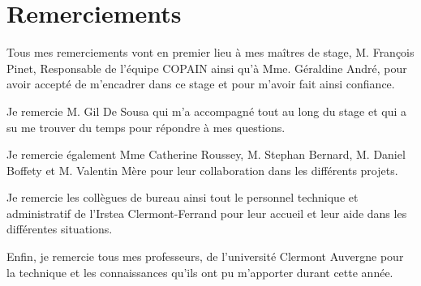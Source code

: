 \pagebreak
\thispagestyle{empty}
\hspace{0pt}
\vfill
\section{Remerciements}
\begin{em}
Tous mes remerciements vont en premier lieu à mes maîtres de stage, M. François Pinet, Responsable de l'équipe COPAIN ainsi qu'à Mme. Géraldine André, pour avoir accepté de m'encadrer dans ce stage et pour m'avoir fait ainsi confiance.

Je remercie  M. Gil De Sousa qui m'a accompagné tout au long du stage et qui a su me trouver du temps pour répondre à mes questions.

Je remercie également Mme Catherine Roussey, M. Stephan Bernard, M. Daniel Boffety et M. Valentin Mère pour leur collaboration dans les différents projets.

Je remercie les collègues de bureau ainsi tout le personnel technique et administratif de l'Irstea Clermont-Ferrand pour leur accueil et leur aide dans les différentes situations.

Enfin, je remercie tous mes professeurs, de l'université Clermont Auvergne  pour la technique et les connaissances qu’ils ont pu m’apporter durant cette année.
\end{em}

\vfill
\hspace{0pt}
\pagebreak